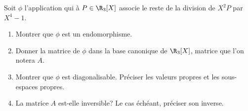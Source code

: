 \begin{enonce}
\begin{exercise}[ID={RMS135 E1502},subtitle={CCINP PSI 2024},tags={},difficulty={}]
  Soit $\phi$ l'application qui à $P\in\R_3[X]$ associe le reste de la division de $X^2 P$ par $X^4 - 1$.

  \begin{enumerate}
    \item Montrer que $\phi$ est un endomorphisme.
    \item Donner la matrice de $\phi$ dans la base canonique de $\R_3[X]$, matrice que l'on notera $A$.

    \item Montrer que $\phi$ est diagonalisable.
      Préciser les valeurs propres et les sous-espaces propres.

    \item La matrice $A$ est-elle inversible?
      Le cas échéant, préciser son inverse.
  \end{enumerate}
\end{exercise}
\begin{solution}
\end{solution}
\end{enonce}
